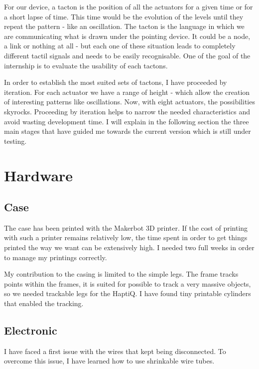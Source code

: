 For our device, a tacton is the position of all the actuators for a
given time or for a short lapse of time. This time would be the
evolution of the levels until they repeat the pattern - like an
oscillation. The tacton is the language in which we are communicating
what is drawn under the pointing device. It could be a node, a link or
nothing at all - but each one of these situation leads to completely
different tactil signals and needs to be easily recognisable. One of the
goal of the internship is to evaluate the usability of each tactons.

In order to establish the most suited sets of tactons, I have proceeded
by iteration. For each actuator we have a range of height - which allow
the creation of interesting patterns like oscillations. Now, with eight
actuators, the possibilities skyrocks. Proceeding by iteration helps to
narrow the needed characteristics and avoid wasting development time. I
will explain in the following section the three main stages that have
guided me towards the current version which is still under testing.

\section{Hardware}\label{implementation-hardware}

\subsection{Case}

The case has been printed with the Makerbot 3D printer. If the cost of printing with such a printer remains relatively low, the time spent in order to get things printed the way we want can be extensively high. I needed two full weeks in order to manage my printings correctly.

My contribution to the casing is limited to the simple legs. The frame tracks points within the frames, it is suited for  possible to track a very massive objects, so we needed trackable legs for the HaptiQ. I have found tiny printable cylinders that enabled the tracking.

\subsection{Electronic}

I have faced a first issue with the wires that kept being disconnected. To overcome this issue, I have learned how to use shrinkable wire tubes.

